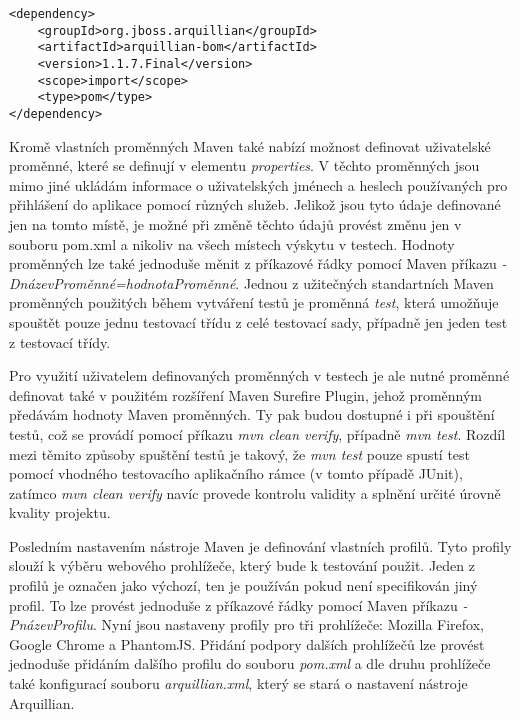 \documentclass[
    color,   %
	table,   %
    twoside, %
]{fithesis3}
\begin{document}
\begin{lstlisting}
<dependency>
	<groupId>org.jboss.arquillian</groupId>
	<artifactId>arquillian-bom</artifactId>
	<version>1.1.7.Final</version>
	<scope>import</scope>
	<type>pom</type>
</dependency>
\end{lstlisting} 

Kromě vlastních proměnných Maven také nabízí možnost definovat uživatelské proměnné, které se definují v elementu \emph{properties}. V těchto proměnných jsou mimo jiné ukládám informace o uživatelských jménech a heslech používaných pro přihlášení do aplikace pomocí různých služeb. Jelikož jsou tyto údaje definované jen na tomto místě, je možné při změně těchto údajů provést změnu jen v souboru pom.xml a nikoliv na všech místech výskytu v testech. Hodnoty proměnných lze také jednoduše měnit z příkazové řádky pomocí Maven příkazu \emph{-DnázevProměnné=hodnotaProměnné}. Jednou z užitečných standartních Maven proměnných použitých během vytváření testů je proměnná \emph{test}, která umožňuje spouštět pouze jednu testovací třídu z celé testovací sady, případně jen jeden test z testovací třídy.

Pro využití uživatelem definovaných proměnných v testech je ale nutné proměnné definovat také v použitém rozšíření Maven Surefire Plugin, jehož proměnným předávám hodnoty Maven proměnných. Ty pak budou dostupné i při spouštění testů, což se provádí pomocí příkazu \emph{mvn clean verify}, případně \emph{mvn test}. Rozdíl mezi těmito způsoby spuštění testů je takový, že \emph{mvn test} pouze spustí test pomocí vhodného testovacího aplikačního rámce (v tomto případě JUnit), zatímco \emph{mvn clean verify} navíc provede kontrolu validity a splnění určité úrovně kvality projektu.

Posledním nastavením nástroje Maven je definování vlastních profilů. Tyto profily slouží k výběru webového prohlížeče, který bude k testování použit. Jeden z profilů je označen jako výchozí, ten je používán pokud není specifikován jiný profil. To lze provést jednoduše z příkazové řádky pomocí Maven příkazu \emph{-PnázevProfilu}. Nyní jsou nastaveny profily pro tři prohlížeče: Mozilla Firefox, Google Chrome a PhantomJS. Přidání podpory dalších prohlížečů lze provést jednoduše přidáním dalšího profilu do souboru \emph{pom.xml} a dle druhu prohlížeče také konfigurací souboru \emph{arquillian.xml}, který se stará o nastavení nástroje Arquillian.
\end{document}
